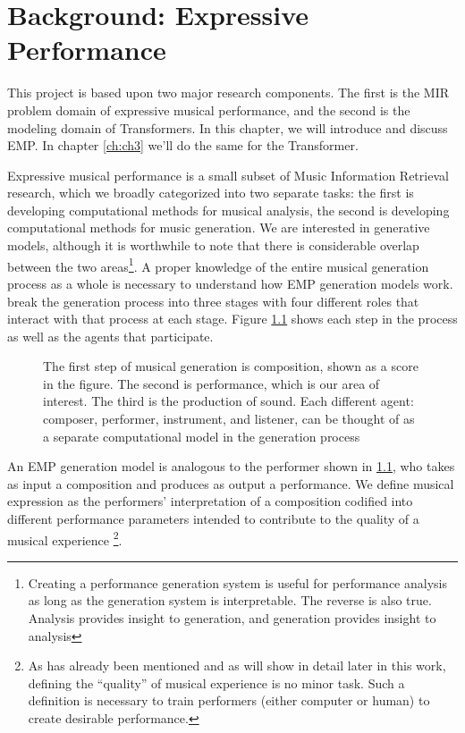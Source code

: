 \chapter{Background: Expressive Performance}\label{ch:ch2}
This project is based upon two major research components. The first is the MIR problem domain of expressive musical performance, and the second is the modeling domain of Transformers. In this chapter, we will introduce and discuss EMP. In chapter \ref{ch:ch3} we'll do the same for the Transformer. 

Expressive musical performance is a small subset of Music Information Retrieval research, which we broadly categorized into two separate tasks: the first is developing computational methods for musical analysis, the second is developing computational methods for music generation. We are interested in generative models, although it is worthwhile to note that there is considerable overlap between the two areas\footnote{Creating a performance generation system is useful for performance analysis as long as the generation system is interpretable. The reverse is also true. Analysis provides insight to generation, and generation provides insight to analysis}. A proper knowledge of the entire musical generation process as a whole is necessary to understand how EMP generation models work. \citet{ji2020comprehensive} break the generation process into three stages with four different roles that interact with that process at each stage. Figure \ref{fig:generation_process} shows each step in the process as well as the agents that participate. 

\begin{figure}
    \centering
    \caption{The first step of musical generation is composition, shown as a score in the figure. The second is performance, which is our area of interest. The third is the production of sound. Each different agent: composer, performer, instrument, and listener, can be thought of as a separate computational model in the generation process}
    \label{fig:generation_process}
\end{figure}

An EMP generation model is analogous to the performer shown in \ref{fig:generation_process}, who takes as input a composition and produces as output a performance. We define musical expression as the performers' interpretation of a composition codified into different performance parameters intended to contribute to the quality of a musical experience%
\footnote{As has already been mentioned and as will show in detail later in this work, defining the ``quality'' of musical experience is no minor task. Such a definition is necessary to train performers (either computer or human) to create desirable performance.}. 

